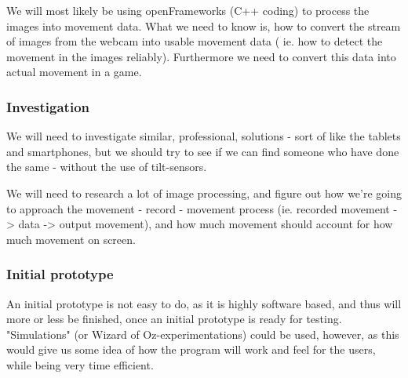 We will most likely be using openFrameworks (C++ coding) to process the images into movement data. What we need to know is, how to convert the stream of images from the webcam into usable movement data ( ie. how to detect the movement in the images reliably). Furthermore we need to convert this data into actual movement in a game.

\subsubsection*{Investigation}
We will need to investigate similar, professional, solutions - sort of like the tablets and smartphones, but we should try to see if we can find someone who have done the same - without the use of tilt-sensors.
\bigskip

We will need to research a lot of image processing, and figure out how we're going to approach the movement - record - movement process (ie. recorded movement -> data -> output movement), and how much movement should account for how much movement on screen. 

\subsubsection*{Initial prototype}
An initial prototype is not easy to do, as it is highly software based, and thus will more or less be finished, once an initial prototype is ready for testing. "Simulations" (or Wizard of Oz-experimentations) could be used, however, as this would give us some idea of how the program will work and feel for the users, while being very time efficient.



\clearpage

\clearpage

\clearpage

\clearpage

\clearpage
